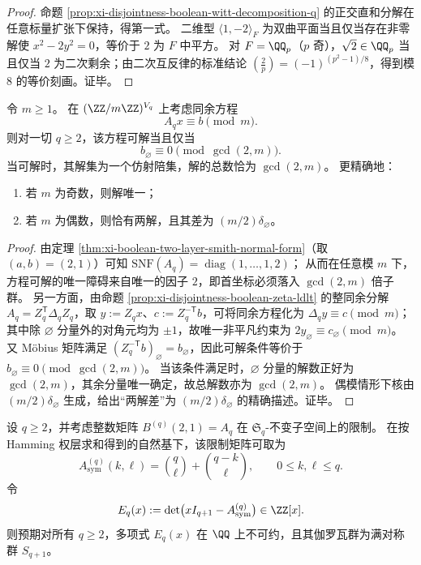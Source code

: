 \begin{proof}
命题 \ref{prop:xi-disjointness-boolean-witt-decomposition-q} 的正交直和分解在任意标量扩张下保持，得第一式。
二维型 \(\langle 1,-2\rangle_F\) 为双曲平面当且仅当存在非零解使 \(x^2-2y^2=0\)，等价于 \(2\) 为 \(F\) 中平方。
对 \(F=\QQ_p\)（\(p\) 奇），\(\sqrt2\in\QQ_p\) 当且仅当 \(2\) 为二次剩余；由二次互反律的标准结论
\(\left(\frac{2}{p}\right)=(-1)^{(p^2-1)/8}\)，得到模 \(8\) 的等价刻画。证毕。
\end{proof}

\begin{proposition}\label{prop:xi-disjointness-boolean-congruence-solvability-gcd2m}
令 \(m\ge 1\)。
在 \((\ZZ/m\ZZ)^{V_q}\) 上考虑同余方程
\[
A_qx\equiv b\pmod m.
\]
则对一切 \(q\ge 2\)，该方程可解当且仅当
\[
b_{\varnothing}\equiv 0\pmod{\gcd(2,m)}.
\]
当可解时，其解集为一个仿射陪集，解的总数恰为 \(\gcd(2,m)\)。
更精确地：
\begin{enumerate}
  \item 若 \(m\) 为奇数，则解唯一；
  \item 若 \(m\) 为偶数，则恰有两解，且其差为 \((m/2)\delta_{\varnothing}\)。
\end{enumerate}
\end{proposition}

\begin{proof}
由定理 \ref{thm:xi-boolean-two-layer-smith-normal-form}（取 \((a,b)=(2,1)\)）可知
\(
\mathrm{SNF}(A_q)=\operatorname{diag}(1,\dots,1,2)
\)；
从而在任意模 \(m\) 下，方程可解的唯一障碍来自唯一的因子 \(2\)，即首坐标必须落入 \(\gcd(2,m)\) 倍子群。
另一方面，由命题 \ref{prop:xi-disjointness-boolean-zeta-ldlt} 的整同余分解 \(A_q=Z_q^{\mathsf T}\Delta_q Z_q\)，取 \(y:=Z_qx\)、\(c:=Z_q^{-\mathsf T}b\)，可将同余方程化为
\(\Delta_q y\equiv c\pmod m\)；
其中除 \(\varnothing\) 分量外的对角元均为 \(\pm 1\)，故唯一非平凡约束为
\(
2y_{\varnothing}\equiv c_{\varnothing}\pmod m
\)。
又 Möbius 矩阵满足 \((Z_q^{-\mathsf T}b)_{\varnothing}=b_{\varnothing}\)，因此可解条件等价于 \(b_{\varnothing}\equiv 0\pmod{\gcd(2,m)}\)。
当该条件满足时，\(\varnothing\) 分量的解数正好为 \(\gcd(2,m)\)，其余分量唯一确定，故总解数亦为 \(\gcd(2,m)\)。
偶模情形下核由 \((m/2)\delta_{\varnothing}\) 生成，给出“两解差”为 \((m/2)\delta_{\varnothing}\) 的精确描述。证毕。
\end{proof}

\begin{conjecture}\label{conj:xi-boolean-two-layer-symmetric-block-galois}
设 \(q\ge 2\)，并考虑整数矩阵 \(B^{(q)}(2,1)=A_q\) 在 \(\mathfrak S_q\)-不变子空间上的限制。
在按 Hamming 权层求和得到的自然基下，该限制矩阵可取为
\[
A_{\mathrm{sym}}^{(q)}(k,\ell)=\binom{q}{\ell}+\binom{q-k}{\ell},
\qquad 0\le k,\ell\le q.
\]
令
\[
E_q(x):=\det\bigl(xI_{q+1}-A_{\mathrm{sym}}^{(q)}\bigr)\in\ZZ[x].
\]
则预期对所有 \(q\ge 2\)，多项式 \(E_q(x)\) 在 \(\QQ\) 上不可约，且其伽罗瓦群为满对称群 \(S_{q+1}\)。
\end{conjecture}

